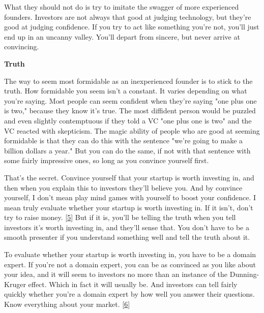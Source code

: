 What they should not do is try to imitate the
                    swagger of more experienced founders. Investors are not
                    always that good at judging technology, but they're good at
                    judging confidence. If you try to act like something you're
                    not, you'll just end up in an uncanny valley. You'll depart
                    from sincere, but never arrive at convincing.

\textbf{Truth}

The way to seem most formidable as an
                    inexperienced founder is to stick to the truth. How
                    formidable you seem isn't a constant. It varies depending on
                    what you're saying. Most people can seem confident when
                    they're saying "one plus one is two," because they know it's
                    true. The most diffident person would be puzzled and even
                    slightly contemptuous if they told a VC "one plus one is
                    two" and the VC reacted with skepticism. The magic ability
                    of people who are good at seeming formidable is that they
                    can do this with the sentence "we're going to make a billion
                    dollars a year." But you can do the same, if not with that
                    sentence with some fairly impressive ones, so long as you
                    convince yourself first.

That's the secret.
                    Convince yourself that your startup is worth investing in,
                    and then when you explain this to investors they'll believe
                    you. And by convince yourself, I don't mean play mind games
                    with yourself to boost your confidence. I mean truly
                    evaluate whether your startup is worth investing in. If it
                    isn't, don't try to raise money.
                    [\href{\#f5n}{5}]
                    But if it is, you'll be telling the truth when you tell
                    investors it's worth investing in, and they'll sense that.
                    You don't have to be a smooth presenter if you understand
                    something well and tell the truth about it.

To
                    evaluate whether your startup is worth investing in, you
                    have to be a domain expert. If you're not a domain expert,
                    you can be as convinced as you like about your idea, and it
                    will seem to investors no more than an instance of the
                    Dunning-Kruger effect. Which in fact it will usually be. And
                    investors can tell fairly quickly whether you're a domain
                    expert by how well you answer their questions. Know
                    everything about your market.
                    [\href{\#f6n}{6}]

